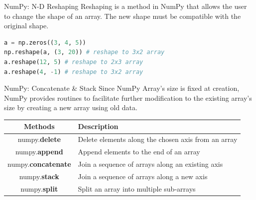\documentclass{beamer}
\begin{document}
    \begin{frame}[fragile]{NumPy: N-D Reshaping}
        Reshaping is a method in NumPy that allows the user to change the shape of an array. The new shape must be compatible with the original shape.
        \begin{example}
            \begin{lstlisting}[language=Python]
a = np.zeros((3, 4, 5))
np.reshape(a, (3, 20)) # reshape to 3x2 array
a.reshape(12, 5) # reshape to 2x3 array
a.reshape(4, -1) # reshape to 3x2 array
            \end{lstlisting}
        \end{example}
    \end{frame}
    \begin{frame}[fragile]{NumPy: Concatenate \& Stack}
        Since NumPy Array's size is fixed at creation, NumPy provides routines to facilitate further modification to the existing array's size by creating a new array using old data.
        \begin{example}
            \begin{center}
                \begin{tabular}{ | c | p{6.0cm} |}
                    \hline
                    \textbf{Methods} & \textbf{Description} \\
                    \hline
                    numpy.\textbf{delete} & Delete elements along the chosen axis from an array \\
                    numpy.\textbf{append} & Append elements to the end of an array \\
                    numpy.\textbf{concatenate} & Join a sequence of arrays along an existing axis \\
                    numpy.\textbf{stack} & Join a sequence of arrays along a new axis \\
                    numpy.\textbf{split} & Split an array into multiple sub-arrays \\
                    \hline
                \end{tabular}
            \end{center}
        \end{example}
    \end{frame}
\end{document}
